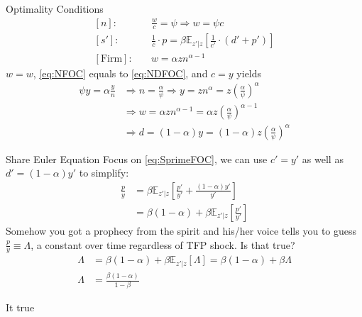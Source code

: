 \documentclass[11pt,aspectratio=43,usenames,dvipsnames]{beamer}
\theoremstyle{definition}
\begin{document}
\begin{frame}{Optimality Conditions}
\label{slide:Optimality_Conditions}
    \begin{align}
        \label{eq:NFOC}
        [n]: \quad
            & \frac{w}{c} = \psi \Rightarrow w = \psi c
        \\
        \label{eq:SprimeFOC}
        [s']: \quad
            & \frac{1}{c} \cdot p = \beta \mathbb{E}_{z'|z} \left[
                \frac{1}{c'} \cdot (d' + p')
            \right]
        \\
        \label{eq:NDFOC}
        [\text{Firm}]: \quad
            & w = \alpha z n^{\alpha-1}
    \end{align}
    $ w = w $, \eqref{eq:NFOC} equals to \eqref{eq:NDFOC}, and $ c = y $ yields
    \begin{align}
        \psi y = \alpha \frac{y}{n}
            & \Rightarrow n = \frac{\alpha}{\psi} \Rightarrow y = z n^{\alpha} = z \left(
                \frac{\alpha}{\psi}
            \right)^{\alpha}
        \\
            & \Rightarrow w = \alpha z n ^{\alpha-1} = \alpha z \left(
                \frac{\alpha}{\psi}
            \right)^{\alpha-1}
        \\
            & \Rightarrow d = (1-\alpha) y = (1-\alpha) z \left(
                \frac{\alpha}{\psi}
            \right)^{\alpha}
    \end{align}

\end{frame}

\begin{frame}{Share Euler Equation}
\label{slide:Share_Euler_Equation}
    Focus on \eqref{eq:SprimeFOC}, we can use $ c' = y' $ as well as $ d' = (1-\alpha) y' $ to simplify:
    \begin{align}
        \frac{p}{y}
            & = \beta \mathbb{E}_{z'|z} \left[
                \frac{p'}{y'} + \frac{(1-\alpha)y'}{y'}
            \right]
        \\
            & = \beta (1-\alpha) + \beta \mathbb{E}_{z'|z} \left[
                \frac{p'}{y'}
            \right]
    \end{align}
    Somehow you got a prophecy from the spirit and his/her voice tells you to guess $ \displaystyle \frac{p}{y} \equiv \Lambda $, a constant over time regardless of TFP shock. Is that true?
    \begin{align}
        \Lambda
            & = \beta (1-\alpha) + \beta \mathbb{E}_{z'|z} \left[
                \Lambda
            \right] = \beta(1-\alpha) + \beta \Lambda
        \\
        \Lambda
            & = \frac{\beta(1-\alpha)}{1-\beta}
    \end{align}
    \begin{center}
        It true \faAngellist \faAngellist \faAngellist
    \end{center}
\end{frame}
\end{document}
